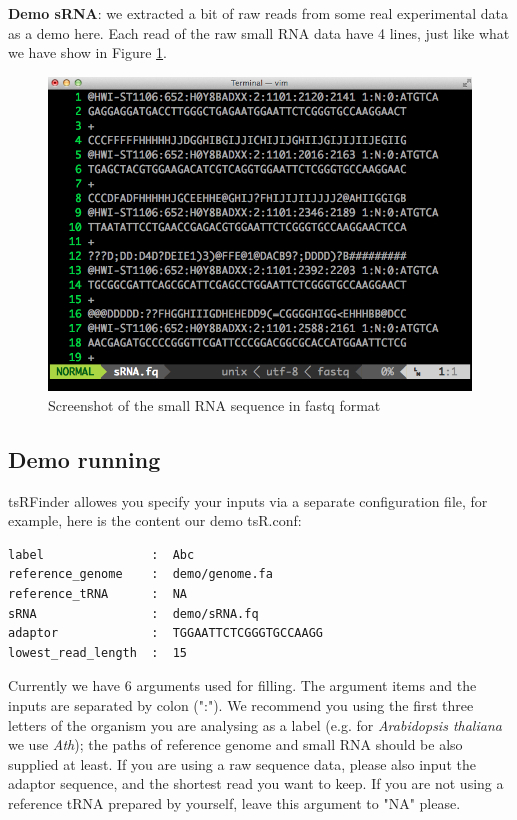 \documentclass[11pt, a4paper]{article}
\begin{document}
\textbf{Demo sRNA}: we extracted a bit of raw reads from some real experimental data as a demo here. Each read of the raw small RNA data have 4 lines, just like what we have show in Figure \ref{fastq}.

\begin{figure}[htbp]
\begin{center}
\includegraphics[width=12cm]{fastq.png}
\caption{Screenshot of the small RNA sequence in fastq format} 
\label{fastq}
\end{center}
\end{figure}

\subsection{Demo running}

tsRFinder allowes you specify your inputs via a separate configuration file, for example, here is the content our demo tsR.conf:

\begin{verbatim}
label               :  Abc
reference_genome    :  demo/genome.fa 
reference_tRNA      :  NA
sRNA                :  demo/sRNA.fq
adaptor             :  TGGAATTCTCGGGTGCCAAGG
lowest_read_length  :  15
\end{verbatim}

Currently we have 6 arguments used for filling. The argument items and the inputs are separated by colon (":"). We recommend you using the first three letters of the organism you are analysing as a label (e.g. for \textit{Arabidopsis thaliana} we use \textit{Ath}); the paths of reference genome and small RNA should be also supplied at least. If you are using a raw sequence data, please also input the adaptor sequence, and the shortest read you want to keep. If you are not using a reference tRNA prepared by yourself, leave this argument to "NA" please.
\end{document}
